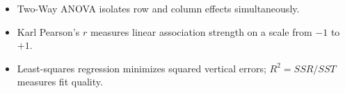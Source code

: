 \documentclass[10pt,a4paper]{article}
\newenvironment{keytake}{\begin{tcolorbox}}{\end{tcolorbox}}
\begin{document}
\begin{keytake}
\begin{itemize}
\item Two-Way ANOVA isolates row and column effects simultaneously.
\item Karl Pearson's $r$ measures linear association strength on a scale from $-1$ to $+1$.
\item Least-squares regression minimizes squared vertical errors; $R^2 = SSR / SST$ measures fit quality.
\end{itemize}
\end{keytake}
\end{document}
